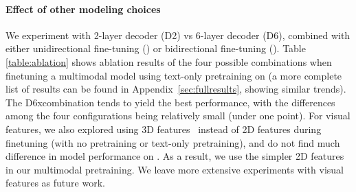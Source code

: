 \documentclass[11pt,a4paper]{article}
\begin{document}
 \paragraph{Effect of other modeling choices}
We experiment with 2-layer decoder (D2) vs 6-layer decoder (D6), combined with either unidirectional fine-tuning (\textbf{\unimt}) or bidirectional fine-tuning (\textbf{\bimt}).
Table \ref{table:ablation} shows ablation results of the four possible combinations when finetuning a multimodal model using text-only pretraining on \youcook (a more complete list of results can be found in Appendix~\ref{sec:fullresults}, showing similar trends).
The D6x\bimt combination tends to yield the best performance, with the differences among the four configurations being relatively small (under one \rouge point).  
For visual features, we also explored using 3D features~\citep{xie2018rethinking} instead of 2D features during finetuning (with no pretraining or text-only pretraining), and do not find much difference in model performance on \youcook.
As a result, we use the simpler 2D features in our multimodal pretraining.  We leave more extensive experiments with visual features  as future work. 















\iffalse
\paragraph{Effect of Bidirectional Finetuning.} The second most important factor is bidirectional finetuning. Using some variant of bidirectional finetuning is always beneficial, both for text-only and multimodal video captioning, whether training from scratch or from a pretraind model. 
We find it surprising that bidirectional finetuning helps even for pretrained models. Our original hypothesis was that bidirectional training would only help when training from scratch because it would help learn better word embeddings since the captioning datasets are so small. We leave to future work to understand why bidirectional finetuning helps for pretrained models.
However, only the \bimt variant is consistently better in the multimodal case; we hypothesize that the model might have difficulties sharing the same cross-modal attention modules between ASR+video$\to$CAP and CAP+video$\to$ASR, whereas with \bimt the attention modules are only used for one direction.
\fi
\end{document}
